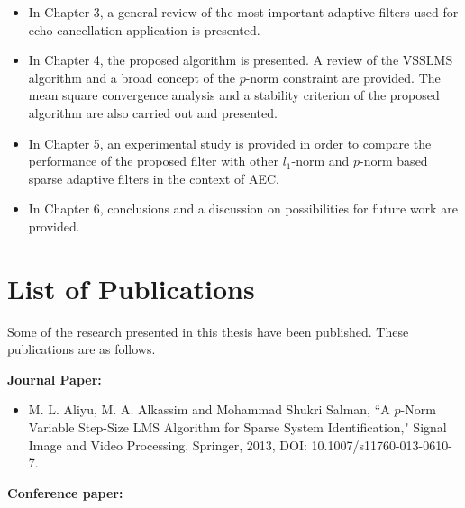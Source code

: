 \vspace{-0.8cm}
\begin{itemize}
  \item  In Chapter 3, a general review of the most important adaptive filters used for echo cancellation application is presented. %
\vspace{-0.3cm}
  \item In Chapter 4, the proposed algorithm is presented. A review of the VSSLMS algorithm and a broad concept of the $p$-norm constraint are provided. The mean square convergence analysis and a stability criterion of the proposed algorithm are also carried out and presented.
\vspace{-0.3cm}
  \item In Chapter 5, an experimental study is provided in order to compare the performance of the proposed filter with other $l_1$-norm and $p$-norm based sparse adaptive filters  in the context of AEC.
\vspace{-0.3cm}
  \item In Chapter 6, conclusions and a discussion on possibilities for future work are provided.
\end{itemize}

\vspace{-0.5cm}
\section{List of Publications}\label{sec:2.5}
\vspace{-0.5cm}
\noindent Some of the research presented in this thesis have been published. These publications are as follows.

\vspace{-0.3cm}
\par
\noindent \textbf{Journal Paper:}

\vspace{-1cm}
\begin{itemize}
\item M. L. Aliyu, M. A. Alkassim and Mohammad Shukri Salman, ``A $p$-Norm Variable Step-Size LMS Algorithm for Sparse System Identification," Signal Image and Video Processing, Springer, 2013, DOI: 10.1007/s11760-013-0610-7.
\end{itemize}

\vspace{-1cm}
\par
\noindent \textbf{Conference paper:}

